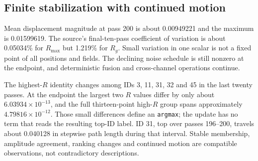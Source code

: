 \documentclass[11pt,a4paper]{article}
\begin{document}
\subsection{Finite stabilization with continued motion}
Mean displacement magnitude at pass 200 is about 0.00949221 and the maximum is 0.01599619. The source's final-ten-pass coefficient of variation is about 0.05034\% for $R_{\max}$ but 1.219\% for $R_g$. Small variation in one scalar is not a fixed point of all positions and fields. The declining noise schedule is still nonzero at the endpoint, and deterministic fusion and cross-channel operations continue.

The highest-$R$ identity changes among IDs 3, 11, 31, 32 and 45 in the last twenty passes. At the endpoint the largest two $R$ values differ by only about $6.03934\times10^{-13}$, and the full thirteen-point high-$R$ group spans approximately $4.79816\times10^{-12}$. Those small differences define an \texttt{argmax}; the update has no term that reads the resulting top-ID label. ID 31, top over passes 196--200, travels about 0.040128 in stepwise path length during that interval. Stable membership, amplitude agreement, ranking changes and continued motion are compatible observations, not contradictory descriptions.
\end{document}
